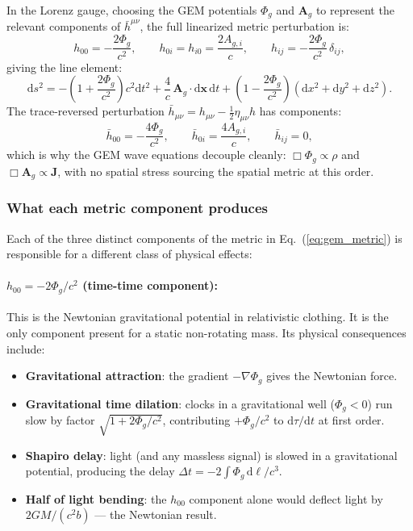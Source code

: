 \documentclass[11pt,a4paper]{article}
\newcommand{\vv}[1]{\mathbf{#1}}
\newcommand{\Phig}{\Phi_g}
\newcommand{\Ag}{\vv{A}_g}
\newcommand{\dd}{\mathrm{d}}
\begin{document}
In the Lorenz gauge, choosing the GEM potentials $\Phig$ and $\Ag$ to represent the relevant components of $\bar{h}^{\mu\nu}$, the full linearized metric perturbation is:
\begin{equation}
\label{eq:gem_metric}
  h_{00} = -\frac{2\Phig}{c^2}, \qquad
  h_{0i} = h_{i0} = \frac{2A_{g,i}}{c}, \qquad
  h_{ij} = -\frac{2\Phig}{c^2}\,\delta_{ij},
\end{equation}
giving the line element:
\begin{equation}
\label{eq:gem_line_element}
  \dd s^2 = -\!\left(1+\frac{2\Phig}{c^2}\right)c^2\dd t^2
            + \frac{4}{c}\,\Ag\cdot\dd\vv{x}\,\dd t
            + \left(1-\frac{2\Phig}{c^2}\right)\!\left(\dd x^2+\dd y^2+\dd z^2\right).
\end{equation}
The trace-reversed perturbation $\bar{h}_{\mu\nu} = h_{\mu\nu} - \tfrac{1}{2}\eta_{\mu\nu}h$ has components:
\begin{equation}
  \bar{h}_{00} = -\frac{4\Phig}{c^2}, \qquad
  \bar{h}_{0i} = \frac{4A_{g,i}}{c}, \qquad
  \bar{h}_{ij} = 0,
\end{equation}
which is why the GEM wave equations decouple cleanly: $\Box\Phig \propto \rho$ and $\Box\Ag \propto \vv{J}$, with no spatial stress sourcing the spatial metric at this order.

\subsubsection*{What each metric component produces}

Each of the three distinct components of the metric in Eq.~(\ref{eq:gem_metric}) is responsible for a different class of physical effects:

\paragraph{$h_{00} = -2\Phig/c^2$ (time-time component):}
This is the Newtonian gravitational potential in relativistic clothing.  It is the only component present for a static non-rotating mass.  Its physical consequences include:
\begin{itemize}
  \item \textbf{Gravitational attraction}: the gradient $-\nabla\Phig$ gives the Newtonian force.
  \item \textbf{Gravitational time dilation}: clocks in a gravitational well ($\Phig < 0$) run slow by factor $\sqrt{1+2\Phig/c^2}$, contributing $+\Phig/c^2$ to $\dd\tau/\dd t$ at first order.
  \item \textbf{Shapiro delay}: light (and any massless signal) is slowed in a gravitational potential, producing the delay $\Delta t = -2\int\Phig\,\dd\ell/c^3$.
  \item \textbf{Half of light bending}: the $h_{00}$ component alone would deflect light by $2GM/(c^2 b)$ --- the Newtonian result.
\end{itemize}
\end{document}
